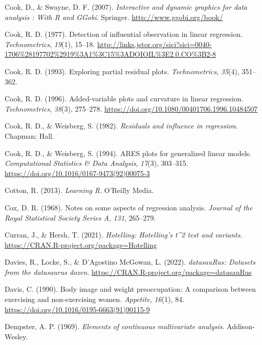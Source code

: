 \documentclass[
  letterpaper,
  10pt,
  krantz2]{krantz}
\newlength{\cslhangindent}
\newenvironment{CSLReferences}[2] %
 {\begin{list}{}{%
  \setlength{\itemindent}{0pt}
  \setlength{\leftmargin}{0pt}
  \setlength{\parsep}{0pt}
  \ifodd #1
   \setlength{\leftmargin}{\cslhangindent}
   \setlength{\itemindent}{-1\cslhangindent}
  \fi
  \setlength{\itemsep}{#2\baselineskip}}}
 {\end{list}}
\begin{document}
{\begin{CSLReferences}{1}{0}
Cook, D., \& Swayne, D. F. (2007). \emph{Interactive and dynamic
graphics for data analysis : With {R} and {GGobi}}. Springer.
\url{http://www.ggobi.org/book/}

Cook, R. D. (1977). Detection of influential observation in linear
regression. \emph{Technometrics}, \emph{19}(1), 15--18.
\url{http://links.jstor.org/sici?sici=0040-1706\%28197702\%2919\%3A1\%3C15\%3ADOIOIL\%3E2.0.CO\%3B2-8}

Cook, R. D. (1993). Exploring partial residual plots.
\emph{Technometrics}, \emph{35}(4), 351--362.

Cook, R. D. (1996). Added-variable plots and curvature in linear
regression. \emph{Technometrics}, \emph{38}(3), 275--278.
\url{https://doi.org/10.1080/00401706.1996.10484507}

Cook, R. D., \& Weisberg, S. (1982). \emph{Residuals and influence in
regression}. Chapman; Hall.

Cook, R. D., \& Weisberg, S. (1994). ARES plots for generalized linear
models. \emph{Computational Statistics \& Data Analysis}, \emph{17}(3),
303--315. \url{https://doi.org/10.1016/0167-9473(92)00075-3}

Cotton, R. (2013). \emph{{Learning R}}. O'Reilly Media.

Cox, D. R. (1968). Notes on some aspects of regression analysis.
\emph{Journal of the Royal Statistical Society Series A}, \emph{131},
265--279.

Curran, J., \& Hersh, T. (2021). \emph{Hotelling: Hotelling's t\^{}2
test and variants}. \url{https://CRAN.R-project.org/package=Hotelling}

Davies, R., Locke, S., \& D'Agostino McGowan, L. (2022).
\emph{datasauRus: Datasets from the datasaurus dozen}.
\url{https://CRAN.R-project.org/package=datasauRus}

Davis, C. (1990). Body image and weight preoccupation: A comparison
between exercising and non-exercising women. \emph{Appetite},
\emph{16}(1), 84. \url{https://doi.org/10.1016/0195-6663(91)90115-9}

Dempster, A. P. (1969). \emph{Elements of continuous multivariate
analysis}. Addison-Wesley.


\end{CSLReferences}}
\end{document}
